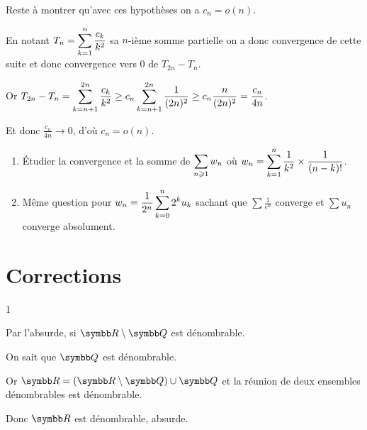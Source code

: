 \begin{exercice}
    Reste à montrer qu'avec ces hypothèses on a $c_{n}=o(n)$.

    En notant $\displaystyle T_{n}=\sum_{k=1}^{n}\frac{c_{k}}{k^{2}}$ sa $n$-ième somme partielle 
    on a donc convergence de cette suite et donc convergence vers 0 de $T_{2n}-T_{n}$.

    Or $\displaystyle T_{2n}-T_{n}=\sum_{k=n+1}^{2n}\frac{c_{k}}{k^{2}}\ge c_{n}\sum_{k=n+1}^{2n}\frac{1}{(2n)^{2}}\ge c_{n}\frac{n}{(2n)^{2}} = \frac{c_n}{4n}$.

    Et donc $\frac{c_n}{4n} \to 0$, d'où $c_{n}=o(n)$.
\end{exercice}

\begin{exercice}
\begin{enumerate}
    \item Étudier la convergence et la somme de $\displaystyle \sum_{n\geqslant1} w_n$ où $\displaystyle w_n = \sum_{k=1}^n \frac{1}{k^2} \times \frac{1}{(n-k)!}$.
    \item Même question pour $\displaystyle w_n = \frac{1}{2^n} \sum_{k=0}^n 2^k u_k$ sachant que $\sum \frac{1}{e^n}$ converge et $\sum u_n$ converge absolument.
\end{enumerate}
\end{exercice}

\newpage
\section{Corrections}

\begin{correction}{1}

Par l'absurde, si $\R \setminus \Q$ est dénombrable.

On sait que $\Q$ est dénombrable.

Or $\R = (\R \setminus \Q) \cup \Q$
et la réunion de deux ensembles dénombrables est dénombrable.
    
Donc $\R$ est dénombrable, absurde.
\end{correction}

